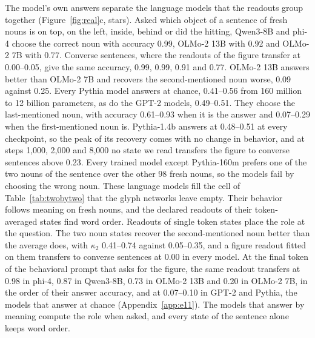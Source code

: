 \documentclass[10pt]{article}
\theoremstyle{plain}
\theoremstyle{remark}
\begin{document}
The model's own answers separate the language models that the readouts group together (Figure~\ref{fig:real}c, stars). Asked which object of a sentence of fresh nouns is on top, on the left, inside, behind or did the hitting, Qwen3-8B and phi-4 choose the correct noun with accuracy 0.99, OLMo-2 13B with 0.92 and OLMo-2 7B with 0.77. Converse sentences, where the readouts of the figure transfer at 0.00--0.05, give the same accuracy, 0.99, 0.99, 0.91 and 0.77. OLMo-2 13B answers better than OLMo-2 7B and recovers the second-mentioned noun worse, 0.09 against 0.25. Every Pythia model answers at chance, 0.41--0.56 from 160 million to 12 billion parameters, as do the GPT-2 models, 0.49--0.51. They choose the last-mentioned noun, with accuracy 0.61--0.93 when it is the answer and 0.07--0.29 when the first-mentioned noun is. Pythia-1.4b answers at 0.48--0.51 at every checkpoint, so the peak of its recovery comes with no change in behavior, and at steps 1{,}000, 2{,}000 and 8{,}000 no state we read transfers the figure to converse sentences above 0.23. Every trained model except Pythia-160m prefers one of the two nouns of the sentence over the other 98 fresh nouns, so the models fail by choosing the wrong noun. These language models fill the cell of Table~\ref{tab:twobytwo} that the glyph networks leave empty. Their behavior follows meaning on fresh nouns, and the declared readouts of their token-averaged states find word order. Readouts of single token states place the role at the question. The two noun states recover the second-mentioned noun better than the average does, with $\kappa_2$ 0.41--0.74 against 0.05--0.35, and a figure readout fitted on them transfers to converse sentences at 0.00 in every model. At the final token of the behavioral prompt that asks for the figure, the same readout transfers at 0.98 in phi-4, 0.87 in Qwen3-8B, 0.73 in OLMo-2 13B and 0.20 in OLMo-2 7B, in the order of their answer accuracy, and at 0.07--0.10 in GPT-2 and Pythia, the models that answer at chance (Appendix~\ref{app:e11}). The models that answer by meaning compute the role when asked, and every state of the sentence alone keeps word order.
\end{document}
